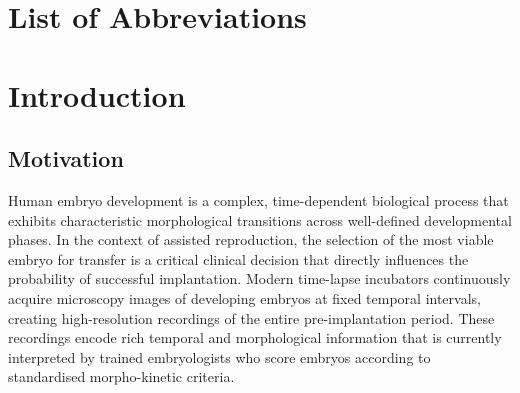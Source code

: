 \documentclass[12pt, a4paper, twoside]{report}
\begin{document}
\listoftables
{}
\cleardoublepage

\chapter*{List of Abbreviations}
\begin{acronym}[CLAHE]
\end{acronym}

\cleardoublepage


\chapter{Introduction}
\label{chap:introduction}

\section{Motivation}
\label{sec:motivation}

Human embryo development is a complex, time-dependent biological process that
exhibits characteristic morphological transitions across well-defined
developmental phases.
In the context of assisted reproduction, the selection of the most viable
embryo for transfer is a critical clinical decision that directly influences
the probability of successful implantation.
Modern time-lapse incubators continuously acquire microscopy images of
developing embryos at fixed temporal intervals, creating high-resolution
recordings of the entire pre-implantation period.
These recordings encode rich temporal and morphological information that is
currently interpreted by trained embryologists who score embryos according to
standardised morpho-kinetic criteria.
\end{document}
